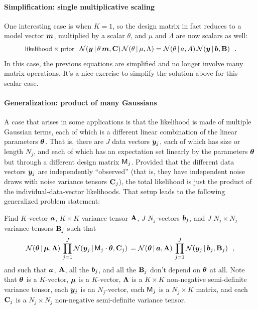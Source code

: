\paragraph{Simplification: single multiplicative scaling}

One interesting case is when $K=1$, so the design matrix in fact
reduces to a model vector $\boldsymbol{m}$, multiplied by a scalar $\theta$, and
$\mu$ and $\Lambda$ are now scalars as well:
\begin{equation}
\mbox{\small likelihood} \times \mbox{\small prior} ~~ \mathcal{N}\!\,(\boldsymbol{y}\,|\,\theta\,\boldsymbol{m},\mathbf{C})\,\mathcal{N}\!\,(\theta\,|\,\mu,\Lambda) = \mathcal{N}\!\,(\theta\,|\, a,A)\,\mathcal{N}\!\,(\boldsymbol{y}\,|\,\boldsymbol{b},\mathbf{B})
~~.
\end{equation}
In this case, the previous equations are simplified and no longer
involve many matrix operations. It's a nice exercise to simplify the
solution above for this scalar case.


\paragraph{Generalization: product of many Gaussians}

A case that arises in some applications is that the
likelihood is made of multiple Gaussian terms, each of which is a
different linear combination of the linear parameters $\boldsymbol{\theta}$.
That is, there are $J$ data vectors $\boldsymbol{y}_j$, each of which has size or length $N_j$,
and each of which has an expectation
set linearly by the parameters $\boldsymbol{\theta}$ but through a different design matrix $\mathsf{M}_j$.
Provided that the different data vectors $\boldsymbol{y}_j$ are independently ``observed'' (that
is, they have independent noise draws with noise variance tensors $\mathbf{C}_j$),
the total likelihood is just the product of
the individual-data-vector likelihoods.
That setup leads to the following generalized problem statement:

Find $K$-vector $\boldsymbol{a}$, $K\times K$ variance tensor $\mathbf{A}$, $J$ $N_j$-vectors $\boldsymbol{b}_j$,
and $J$ $N_j\times N_j$ variance tensors $\mathbf{B}_j$ such that
\begin{equation}\label{eq:genproblem}
\mathcal{N}\!\,(\boldsymbol{\theta}\,|\,\boldsymbol{\mu},\mathbf{\Lambda})\,\prod_{j=1}^J\mathcal{N}\!\,(\boldsymbol{y}_j\,|\,\mathsf{M}_j\cdot\boldsymbol{\theta},\mathbf{C}_j)\,
 = \mathcal{N}\!\,(\boldsymbol{\theta}\,|\,\boldsymbol{a},\mathbf{A})\,\prod_{j=1}^J\mathcal{N}\!\,(\boldsymbol{y}_j\,|\,\boldsymbol{b}_j,\mathbf{B}_j) ~~,
\end{equation}
and such that $\boldsymbol{a}$, $\mathbf{A}$, all the $\boldsymbol{b}_j$, and all the $\mathbf{B}_j$
don't depend on $\boldsymbol{\theta}$ at all.
Note that
$\boldsymbol{\theta}$ is a $K$-vector,
$\boldsymbol{\mu}$ is a $K$-vector,
$\mathbf{\Lambda}$ is a $K\times K$ non-negative semi-definite variance tensor,
each $\boldsymbol{y}_j$ is an $N_j$-vector,
each $\mathsf{M}_j$ is a $N_j\times K$ matrix,
and
each $\mathbf{C}_j$ is a $N_j\times N_j$ non-negative semi-definite variance tensor.

